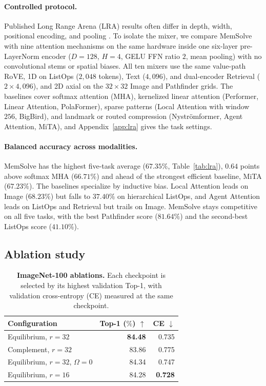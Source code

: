 \documentclass[10pt,twocolumn]{article}
\let\draftsmall\small
\renewcommand{\small}{\draftsmall\fontsize{9}{10}\selectfont}
\begin{document}
\paragraph{Controlled protocol.}
Published Long Range Arena (LRA) results \cite{tay2021lra} often differ in
depth, width, positional encoding, and pooling
\cite{mirallesgonzalez2025locality}.
To isolate the mixer, we compare MemSolve with nine attention mechanisms on
the same hardware inside one six-layer pre-LayerNorm encoder ($D=128$, $H=4$,
GELU FFN ratio $2$, mean pooling) with no convolutional stems or spatial
biases.
All ten mixers use the same value-path RoVE, 1D on ListOps ($2{,}048$ tokens),
Text ($4{,}096$), and dual-encoder Retrieval ($2\times4{,}096$), and 2D axial on
the $32\times32$ Image and Pathfinder grids.
The baselines cover softmax attention (MHA), kernelized linear attention
(Performer, Linear Attention, PolaFormer), sparse patterns (Local Attention
with window $256$, BigBird), and landmark or routed compression
(Nystr\"omformer, Agent Attention, MiTA), and Appendix~\ref{app:lra} gives the
task settings.

\paragraph{Balanced accuracy across modalities.}
MemSolve has the highest five-task average ($67.35\%$, Table~\ref{tab:lra}),
$0.64$ points above softmax MHA ($66.71\%$) and ahead of the strongest
efficient baseline, MiTA ($67.23\%$).
The baselines specialize by inductive bias.
Local Attention leads on Image ($68.23\%$) but falls to $37.40\%$ on
hierarchical ListOps, and Agent Attention leads on ListOps and Retrieval but
trails on Image.
MemSolve stays competitive on all five tasks, with the best Pathfinder score
($81.64\%$) and the second-best ListOps score ($41.10\%$).

\subsection{Ablation study}
\label{sec:ablations}

\begin{table}[!ht]
\centering
\small
\captionsetup{width=.92\linewidth}
\setlength{\tabcolsep}{8.5pt}
\renewcommand{\arraystretch}{1.04}
\begin{tabular}{lrr}
\toprule
Configuration & Top-1 ($\%$) $\uparrow$ & CE $\downarrow$\\
\midrule
\rowcolor{ResultYellow}
Equilibrium, $r=32$ & \textbf{84.48} & 0.735\\
Complement, $r=32$ & 83.86 & 0.775\\
Equilibrium, $r=32$, $\Omega=0$ & 84.34 & 0.747\\
Equilibrium, $r=16$ & 84.28 & \textbf{0.728}\\
\bottomrule
\end{tabular}
\caption{\textbf{ImageNet-100 ablations.}
Each checkpoint is selected by its highest validation Top-1, with validation
cross-entropy (CE) measured at the same checkpoint.}
\label{tab:ablations}
\end{table}
\end{document}
